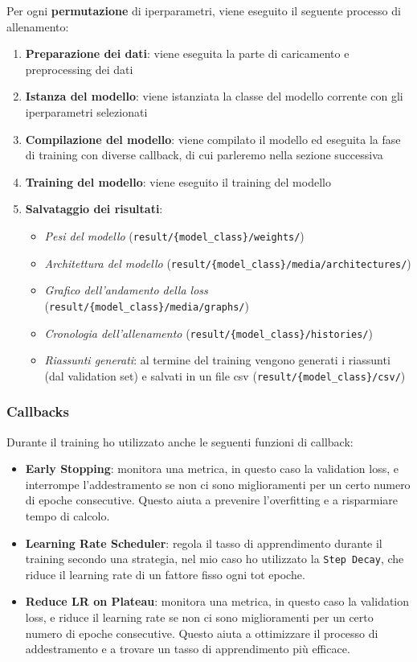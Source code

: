 Per ogni \textbf{permutazione} di iperparametri, viene eseguito il seguente processo di allenamento:
\begin{enumerate}
    \item \textbf{Preparazione dei dati}: viene eseguita la parte di caricamento e preprocessing dei dati
    \item \textbf{Istanza del modello}: viene istanziata la classe del modello corrente con gli iperparametri selezionati
    \item \textbf{Compilazione del modello}: viene compilato il modello ed eseguita la fase di training con diverse callback, di cui parleremo nella sezione successiva
    \item \textbf{Training del modello}: viene eseguito il training del modello 
    \item \textbf{Salvataggio dei risultati}:
    \begin{itemize}
        \item \textit{Pesi del modello} (\texttt{result/\{model\_class\}/weights/})
        \item \textit{Architettura del modello} (\texttt{result/\{model\_class\}/media/architectures/})
        \item \textit{Grafico dell'andamento della loss} (\texttt{result/\{model\_class\}/media/graphs/})
        \item \textit{Cronologia dell'allenamento} (\texttt{result/\{model\_class\}/histories/})
        \item \textit{Riassunti generati}: al termine del training vengono generati i riassunti (dal validation set) e salvati in un file csv (\texttt{result/\{model\_class\}/csv/})
    \end{itemize}
\end{enumerate}

\subsubsection{Callbacks}
Durante il training ho utilizzato anche le seguenti funzioni di callback:
\begin{itemize}
    \item \textbf{Early Stopping}: monitora una metrica, in questo caso la validation loss, e interrompe l'addestramento se non ci sono miglioramenti per un certo numero di epoche consecutive. Questo aiuta a prevenire l'overfitting e a risparmiare tempo di calcolo.
    \item \textbf{Learning Rate Scheduler}: regola il tasso di apprendimento durante il training secondo una strategia, nel mio caso ho utilizzato la \texttt{Step Decay}, che riduce il learning rate di un fattore fisso ogni tot epoche.
    \item \textbf{Reduce LR on Plateau}: monitora una metrica, in questo caso la validation loss, e riduce il learning rate se non ci sono miglioramenti per un certo numero di epoche consecutive. Questo aiuta a ottimizzare il processo di addestramento e a trovare un tasso di apprendimento più efficace.
\end{itemize}

